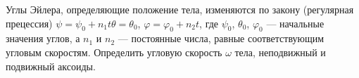 Углы Эйлера, определяющие положение тела, изменяются по закону
(регулярная прецессия) $\psi = \psi _0 + n_1t \theta = \theta _0$,
$\varphi = \varphi _0 + n_2t$, где $\psi _0$, $\theta _0$, $\varphi _0$ ---
начальные значения углов, а $n_1$ и $n_2$ --- постоянные числа,
равные соответствующим угловым скоростям.
Определить угловую скорость $\omega$ тела, неподвижный и подвижный аксоиды.
